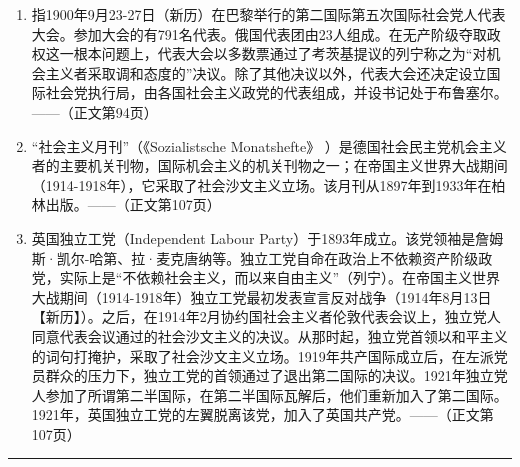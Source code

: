 \begin{enumerate}
	\item 指1900年9月23-27日（新历）在巴黎举行的第二国际第五次国际社会党人代表大会。参加大会的有791名代表。俄国代表团由23人组成。在无产阶级夺取政权这一根本问题上，代表大会以多数票通过了考茨基提议的列宁称之为“对机会主义者采取调和态度的”决议。除了其他决议以外，代表大会还决定设立国际社会党执行局，由各国社会主义政党的代表组成，并设书记处于布鲁塞尔。——（正文第94页）
	\item {\kaishu “社会主义月刊”}（《Sozialistsche Monatshefte》 ）是德国社会民主党机会主义者的主要机关刊物，国际机会主义的机关刊物之一；在帝国主义世界大战期间（1914-1918年），它采取了社会沙文主义立场。该月刊从1897年到1933年在柏林出版。——（正文第107页）
	\item {\kaishu 英国独立工党}（Independent Labour Party）于1893年成立。该党领袖是詹姆斯·凯尔-哈第、拉·麦克唐纳等。独立工党自命在政治上不依赖资产阶级政党，实际上是“不依赖社会主义，而以来自由主义”（{\kaishu 列宁}）。在帝国主义世界大战期间（1914-1918年）独立工党最初发表宣言反对战争（1914年8月13日【新历】）。之后，在1914年2月协约国社会主义者伦敦代表会议上，独立党人同意代表会议通过的社会沙文主义的决议。从那时起，独立党首领以和平主义的词句打掩护，采取了社会沙文主义立场。1919年共产国际成立后，在左派党员群众的压力下，独立工党的首领通过了退出第二国际的决议。1921年独立党人参加了所谓第二半国际，在第二半国际瓦解后，他们重新加入了第二国际。1921年，英国独立工党的左翼脱离该党，加入了英国共产党。——（正文第107页）
\end{enumerate}

\begin{center}
	\rule[-1pt]{2.5cm}{0.1em}
\end{center}